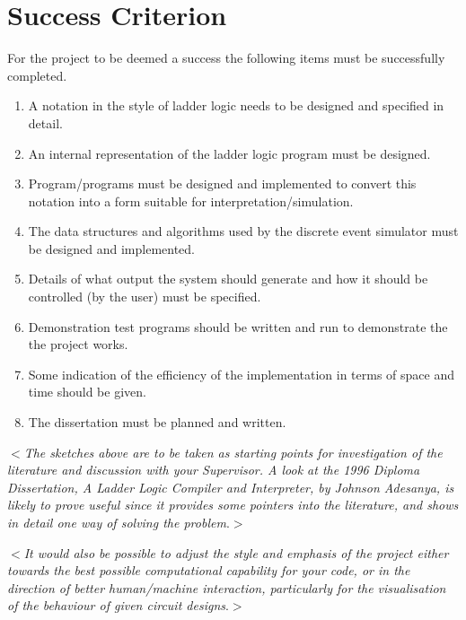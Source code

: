 \documentclass[12pt]{article}
\newcommand{\al}{$<$}
\newcommand{\ar}{$>$}
\begin{document}
\section*{Success Criterion}

For the project to be deemed a success the following items must be
successfully completed.

\begin{enumerate}

\item A notation in the style of ladder logic needs to be designed and
  specified in detail.

\item An internal representation of the ladder logic program must be
  designed.

\item Program/programs must be designed and implemented to convert
  this notation into a form suitable for interpretation/simulation.

\item The data structures and algorithms used by the discrete event simulator
must be designed and implemented.

\item Details of what output the system should generate and how it
  should be controlled (by the user) must be specified.

\item Demonstration test programs should be written and run to
  demonstrate the the project works.

\item Some indication of the efficiency of the implementation in terms
  of space and time should be given.

\item The dissertation must be planned and written.

\end{enumerate}

\al\emph{The sketches above are to be taken as starting points for
  investigation of the literature and discussion with your Supervisor.
  A look at the 1996 Diploma Dissertation, {\rm A Ladder Logic
    Compiler and Interpreter}, by Johnson Adesanya, is likely to prove
  useful since it provides some pointers into the literature, and
  shows in detail one way of solving the problem}.\ar

\medskip \al\emph{It would also be possible to adjust the style and
  emphasis of the project either towards the best possible
  computational capability for your code, or in the direction of
  better human/machine interaction, particularly for the visualisation
  of the behaviour of given circuit designs}.\ar
\end{document}
